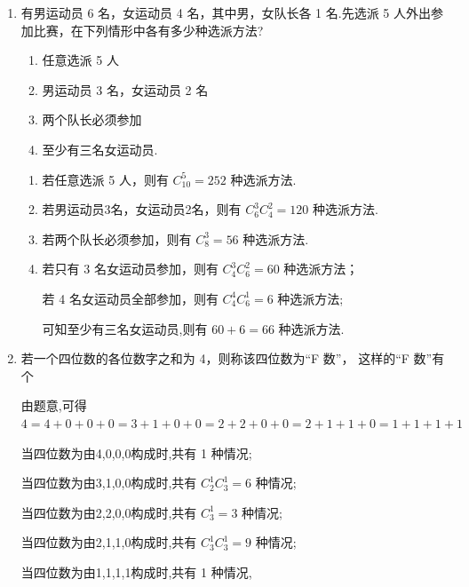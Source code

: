 \begin{enumerate}
\begin{enumerate}
        \item 有男运动员 6 名，女运动员 4 名，其中男，女队长各 1 名.先选派 5 人外出参加比赛，在下列情形中各有多少种选派方法?
        \begin{enumerate}
            \item 任意选派 5 人
            \item 男运动员 3 名，女运动员 2 名
            \item 两个队长必须参加
            \item 至少有三名女运动员.
        \end{enumerate}
        \begin{jieda}
            \begin{enumerate}
                \item 若任意选派 5 人，则有 ${{C}}_{10}^{5} = {252}$ 种选派方法.
                \item 若男运动员3名，女运动员2名，则有 ${{C}}_{6}^{3}{{C}}_{4}^{2} = {120}$ 种选派方法.
                \item 若两个队长必须参加，则有 ${{C}}_{8}^{3} = {56}$ 种选派方法.
                \item 若只有 3 名女运动员参加，则有 ${{C}}_{4}^{3}{{C}}_{6}^{2} = {60}$ 种选派方法；
                
                若 4 名女运动员全部参加，则有 ${{C}}_{4}^{4}{{C}}_{6}^{1} = 6$ 种选派方法;
                
                可知至少有三名女运动员,则有 ${60} + 6 = {66}$ 种选派方法.
            \end{enumerate}
        \end{jieda}
        
        \item 若一个四位数的各位数字之和为 4，则称该四位数为“F 数”， 这样的“F 数”有个
        \begin{jieda}
            由题意,可得 $4 = 4 + 0 + 0 + 0 = 3 + 1 + 0 + 0 = 2 + 2 + 0 + 0 = 2 + 1 + 1 + 0 = 1 + 1 +  1 + 1$
            
            当四位数为由4,0,0,0构成时,共有 1 种情况;
            
            当四位数为由3,1,0,0构成时,共有 ${{C}}_{2}^{1}{{C}}_{3}^{1} = 6$ 种情况;
            
            当四位数为由2,2,0,0构成时,共有 ${{C}}_{3}^{1} = 3$ 种情况;
            
            当四位数为由2,1,1,0构成时,共有 ${{C}}_{3}^{1}{{C}}_{3}^{1} = 9 $ 种情况;
            
            当四位数为由1,1,1,1构成时,共有 1 种情况,
            

\end{jieda}
\end{enumerate}
\end{enumerate}
